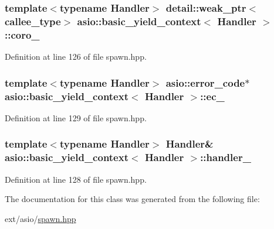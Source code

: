 \subsubsection[{coro\+\_\+}]{\setlength{\rightskip}{0pt plus 5cm}template$<$typename Handler$>$ detail\+::weak\+\_\+ptr$<${\bf callee\+\_\+type}$>$ {\bf asio\+::basic\+\_\+yield\+\_\+context}$<$ Handler $>$\+::coro\+\_\+}\label{classasio_1_1basic__yield__context_a67c4e21f4a7b551f4cba8370e1640ffc}


Definition at line 126 of file spawn.\+hpp.

\hypertarget{classasio_1_1basic__yield__context_a4b515d20df406ce69f526bf26b0fbdd8}{}
\subsubsection[{ec\+\_\+}]{\setlength{\rightskip}{0pt plus 5cm}template$<$typename Handler$>$ {\bf asio\+::error\+\_\+code}$\ast$ {\bf asio\+::basic\+\_\+yield\+\_\+context}$<$ Handler $>$\+::ec\+\_\+}\label{classasio_1_1basic__yield__context_a4b515d20df406ce69f526bf26b0fbdd8}


Definition at line 129 of file spawn.\+hpp.

\hypertarget{classasio_1_1basic__yield__context_a515fcba3f44460975a5da42295ca3c47}{}
\subsubsection[{handler\+\_\+}]{\setlength{\rightskip}{0pt plus 5cm}template$<$typename Handler$>$ Handler\& {\bf asio\+::basic\+\_\+yield\+\_\+context}$<$ Handler $>$\+::handler\+\_\+}\label{classasio_1_1basic__yield__context_a515fcba3f44460975a5da42295ca3c47}


Definition at line 128 of file spawn.\+hpp.



The documentation for this class was generated from the following file\+:\begin{DoxyCompactItemize}
\item 
ext/asio/\hyperlink{spawn_8hpp}{spawn.\+hpp}\end{DoxyCompactItemize}
